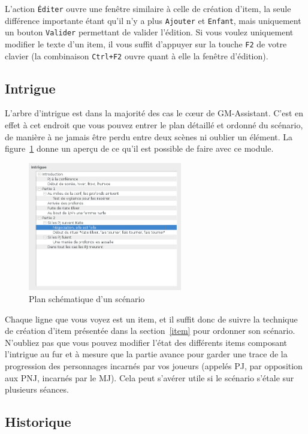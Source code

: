 \documentclass[a4paper,12pt]{article}
\newcommand*{\GMA}{GM-Assistant\xspace}
\newcommand*{\interfaceitem}[1]{\texttt{#1}}
\begin{document}
L'action \interfaceitem{Éditer} ouvre une fenêtre similaire à celle de création d'item, la seule différence importante étant qu'il n'y a plus \interfaceitem{Ajouter} et \interfaceitem{Enfant}, mais uniquement un bouton \interfaceitem{Valider} permettant de valider l'édition.
Si vous voulez uniquement modifier le texte d'un item, il vous suffit d'appuyer sur la touche \interfaceitem{F2} de votre clavier (la combinaison \interfaceitem{Ctrl+F2} ouvre quant à elle la fenêtre d'édition).

\subsection{Intrigue}
\label{sec:intrigue}

L'arbre d'intrigue est dans la majorité des cas le cœur de \GMA.
C'est en effet à cet endroit que vous pouvez entrer le plan détaillé et ordonné du scénario, de manière à ne jamais être perdu entre deux scènes ni oublier un élément.
La figure~\ref{arbre_scenar} donne un aperçu de ce qu'il est possible de faire avec ce module.
\begin{figure}[ht]
    \centerline{\includegraphics[width=0.6\textwidth]{scenario_type}}
    \caption{Plan schématique d'un scénario}
    \label{arbre_scenar}
\end{figure}
Chaque ligne que vous voyez est un item, et il suffit donc de suivre la technique de création d'item présentée dans la section~\ref{item} pour ordonner son scénario.
N'oubliez pas que vous pouvez modifier l'état des différents items composant l'intrigue au fur et à mesure que la partie avance pour garder une trace de la progression des personnages incarnés par vos joueurs (appelés PJ, par opposition aux PNJ, incarnés par le MJ).
Cela peut s'avérer utile si le scénario s'étale sur plusieurs séances.

\subsection{Historique}
\label{sec:historique}
\end{document}

